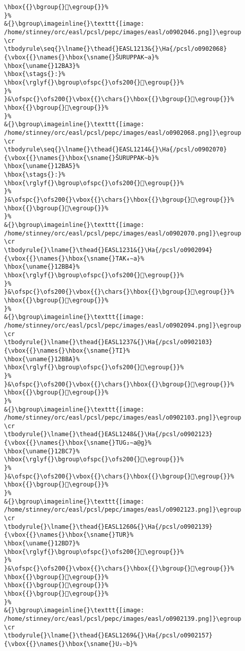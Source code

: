 \begin{verbatim}
\hbox{{}\bgroup{}𒮔\egroup{}}%
}%
&{}\bgroup\imageinline{}\texttt{[image: /home/stinney/orc/easl/pcsl/pepc/images/easl/o0902046.png]}\egroup
\cr
\tbodyrule\seq{}\lname{}\thead{}EASL1213&{}\Ha{/pcsl/o0902068}{\vbox{{}\names{}\hbox{\sname{}ŠURUPPAK∼a}%
\hbox{\uname{}12BA3}%
\hbox{\stags{}:}%
\hbox{\rglyf{}\bgroup\ofspc{}\ofs200{}𒮣\egroup{}}%
}%
}&\ofspc{}\ofs200{}\vbox{{}\chars{}\hbox{{}\bgroup{}𒮢\egroup{}}%
\hbox{{}\bgroup{}𒮣\egroup{}}%
}%
&{}\bgroup\imageinline{}\texttt{[image: /home/stinney/orc/easl/pcsl/pepc/images/easl/o0902068.png]}\egroup
\cr
\tbodyrule\seq{}\lname{}\thead{}EASL1214&{}\Ha{/pcsl/o0902070}{\vbox{{}\names{}\hbox{\sname{}ŠURUPPAK∼b}%
\hbox{\uname{}12BA5}%
\hbox{\stags{}:}%
\hbox{\rglyf{}\bgroup\ofspc{}\ofs200{}𒮥\egroup{}}%
}%
}&\ofspc{}\ofs200{}\vbox{{}\chars{}\hbox{{}\bgroup{}𒮤\egroup{}}%
\hbox{{}\bgroup{}𒮥\egroup{}}%
}%
&{}\bgroup\imageinline{}\texttt{[image: /home/stinney/orc/easl/pcsl/pepc/images/easl/o0902070.png]}\egroup
\cr
\tbodyrule{}\lname{}\thead{}EASL1231&{}\Ha{/pcsl/o0902094}{\vbox{{}\names{}\hbox{\sname{}TAK₄∼a}%
\hbox{\uname{}12BB4}%
\hbox{\rglyf{}\bgroup\ofspc{}\ofs200{}𒮴\egroup{}}%
}%
}&\ofspc{}\ofs200{}\vbox{{}\chars{}\hbox{{}\bgroup{}𒮶\egroup{}}%
\hbox{{}\bgroup{}𒮴\egroup{}}%
}%
&{}\bgroup\imageinline{}\texttt{[image: /home/stinney/orc/easl/pcsl/pepc/images/easl/o0902094.png]}\egroup
\cr
\tbodyrule{}\lname{}\thead{}EASL1237&{}\Ha{/pcsl/o0902103}{\vbox{{}\names{}\hbox{\sname{}TI}%
\hbox{\uname{}12BBA}%
\hbox{\rglyf{}\bgroup\ofspc{}\ofs200{}𒮺\egroup{}}%
}%
}&\ofspc{}\ofs200{}\vbox{{}\chars{}\hbox{{}\bgroup{}𒮺\egroup{}}%
\hbox{{}\bgroup{}𒮾\egroup{}}%
}%
&{}\bgroup\imageinline{}\texttt{[image: /home/stinney/orc/easl/pcsl/pepc/images/easl/o0902103.png]}\egroup
\cr
\tbodyrule{}\lname{}\thead{}EASL1248&{}\Ha{/pcsl/o0902123}{\vbox{{}\names{}\hbox{\sname{}TUG₂∼a@g}%
\hbox{\uname{}12BC7}%
\hbox{\rglyf{}\bgroup\ofspc{}\ofs200{}𒯇\egroup{}}%
}%
}&\ofspc{}\ofs200{}\vbox{{}\chars{}\hbox{{}\bgroup{}𒯆\egroup{}}%
\hbox{{}\bgroup{}𒯇\egroup{}}%
}%
&{}\bgroup\imageinline{}\texttt{[image: /home/stinney/orc/easl/pcsl/pepc/images/easl/o0902123.png]}\egroup
\cr
\tbodyrule{}\lname{}\thead{}EASL1260&{}\Ha{/pcsl/o0902139}{\vbox{{}\names{}\hbox{\sname{}TUR}%
\hbox{\uname{}12BD7}%
\hbox{\rglyf{}\bgroup\ofspc{}\ofs200{}𒯗\egroup{}}%
}%
}&\ofspc{}\ofs200{}\vbox{{}\chars{}\hbox{{}\bgroup{}𒯓\egroup{}}%
\hbox{{}\bgroup{}𒯕\egroup{}}%
\hbox{{}\bgroup{}𒯖\egroup{}}%
\hbox{{}\bgroup{}𒯗\egroup{}}%
}%
&{}\bgroup\imageinline{}\texttt{[image: /home/stinney/orc/easl/pcsl/pepc/images/easl/o0902139.png]}\egroup
\cr
\tbodyrule{}\lname{}\thead{}EASL1269&{}\Ha{/pcsl/o0902157}{\vbox{{}\names{}\hbox{\sname{}U₂∼b}%

\end{verbatim}
